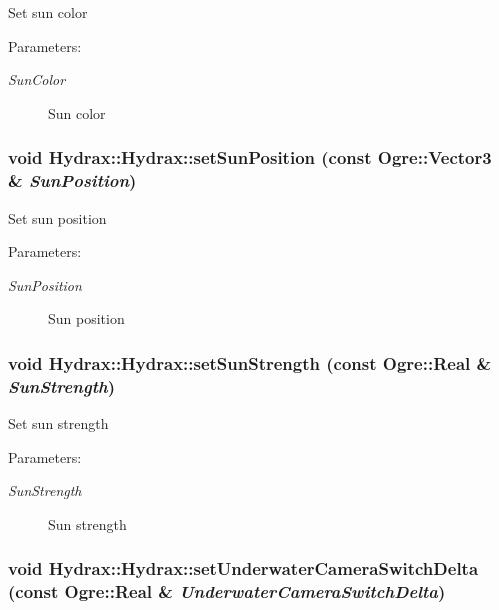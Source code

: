 Set sun color \begin{Desc}
\item[Parameters:]
\begin{description}
\item[{\em SunColor}]Sun color \end{description}
\end{Desc}
\hypertarget{class_hydrax_1_1_hydrax_86467f51a5b69343a97ff6536c922929}{
\subsubsection[{setSunPosition}]{\setlength{\rightskip}{0pt plus 5cm}void Hydrax::Hydrax::setSunPosition (const Ogre::Vector3 \& {\em SunPosition})}}
\label{class_hydrax_1_1_hydrax_86467f51a5b69343a97ff6536c922929}


Set sun position \begin{Desc}
\item[Parameters:]
\begin{description}
\item[{\em SunPosition}]Sun position \end{description}
\end{Desc}
\hypertarget{class_hydrax_1_1_hydrax_ad0a9050fe394da479b1e0431d99a151}{
\subsubsection[{setSunStrength}]{\setlength{\rightskip}{0pt plus 5cm}void Hydrax::Hydrax::setSunStrength (const Ogre::Real \& {\em SunStrength})}}
\label{class_hydrax_1_1_hydrax_ad0a9050fe394da479b1e0431d99a151}


Set sun strength \begin{Desc}
\item[Parameters:]
\begin{description}
\item[{\em SunStrength}]Sun strength \end{description}
\end{Desc}
\hypertarget{class_hydrax_1_1_hydrax_2ea24fcd2e01968d8dc86c36168a5819}{
\subsubsection[{setUnderwaterCameraSwitchDelta}]{\setlength{\rightskip}{0pt plus 5cm}void Hydrax::Hydrax::setUnderwaterCameraSwitchDelta (const Ogre::Real \& {\em UnderwaterCameraSwitchDelta})}}
\label{class_hydrax_1_1_hydrax_2ea24fcd2e01968d8dc86c36168a5819}


